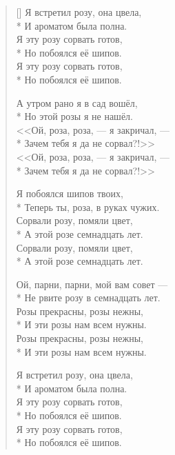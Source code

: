 \documentclass[a4paper,oneside,14pt]{scrbook}
\begin{document}
    \settowidth{\versewidth}{Я встретил розу, она цвела}
    \begin{verse}[\versewidth]
        Я встретил розу, она цвела,\\*
        И ароматом была полна.\\
        Я эту розу сорвать готов,\\*
        Но побоялся её шипов.\\
        Я эту розу сорвать готов,\\*
        Но побоялся её шипов.

        \vin А утром рано я в сад вошёл,\\*
        \vin Но этой розы я не нашёл.\\
        \vin <<Ой, роза, роза, --- я закричал, ---\\*
        \vin Зачем тебя я да не сорвал?!>>\\
        \vin <<Ой, роза, роза, --- я закричал, ---\\*
        \vin Зачем тебя я да не сорвал?!>>

        Я побоялся шипов твоих,\\*
        Теперь ты, роза, в руках чужих.\\
        Сорвали розу, помяли цвет,\\*
        А этой розе семнадцать лет.\\
        Сорвали розу, помяли цвет,\\*
        А этой розе семнадцать лет.

        \vin Ой, парни, парни, мой вам совет ---\\*
        \vin Не рвите розу в семнадцать лет.\\
        \vin Розы прекрасны, розы нежны,\\*
        \vin И эти розы нам всем нужны.\\
        \vin Розы прекрасны, розы нежны,\\*
        \vin И эти розы нам всем нужны.

        Я встретил розу, она цвела,\\*
        И ароматом была полна.\\
        Я эту розу сорвать готов, \\*
        Но побоялся её шипов.\\
        Я эту розу сорвать готов,\\*
        Но побоялся её шипов.        
    \end{verse}
        
\end{document}

